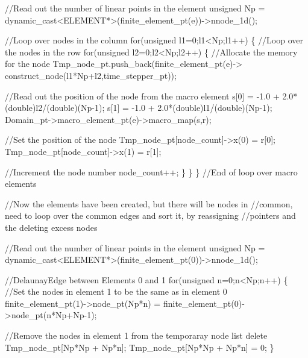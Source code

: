 \begin{DoxyCodeInclude}
     \textcolor{comment}{//Read out the number of linear points in the element}
     \textcolor{keywordtype}{unsigned} Np = 
      \textcolor{keyword}{dynamic\_cast<}ELEMENT*\textcolor{keyword}{>}(finite\_element\_pt(e))->nnode\_1d();
     
     \textcolor{comment}{//Loop over nodes in the column}
     \textcolor{keywordflow}{for}(\textcolor{keywordtype}{unsigned} l1=0;l1<Np;l1++)
      \{
       \textcolor{comment}{//Loop over the nodes in the row}
       \textcolor{keywordflow}{for}(\textcolor{keywordtype}{unsigned} l2=0;l2<Np;l2++)
        \{
         \textcolor{comment}{//Allocate the memory for the node}
         Tmp\_node\_pt.push\_back(finite\_element\_pt(e)->
                           construct\_node(l1*Np+l2,time\_stepper\_pt));
         
         \textcolor{comment}{//Read out the position of the node from the macro element}
         s[0] = -1.0 + 2.0*(double)l2/(\textcolor{keywordtype}{double})(Np-1);
         s[1] = -1.0 + 2.0*(double)l1/(\textcolor{keywordtype}{double})(Np-1);
         Domain\_pt->macro\_element\_pt(e)->macro\_map(s,r);
         
         \textcolor{comment}{//Set the position of the node}
         Tmp\_node\_pt[node\_count]->x(0) = r[0];
         Tmp\_node\_pt[node\_count]->x(1) = r[1];
         
         \textcolor{comment}{//Increment the node number}
         node\_count++;
        \}
      \}
    \} \textcolor{comment}{//End of loop over macro elements}
 
   \textcolor{comment}{//Now the elements have been created, but there will be nodes in }
   \textcolor{comment}{//common, need to loop over the common edges and sort it, by reassigning}
   \textcolor{comment}{//pointers and the deleting excess nodes}
   
   \textcolor{comment}{//Read out the number of linear points in the element}
   \textcolor{keywordtype}{unsigned} Np = 
    \textcolor{keyword}{dynamic\_cast<}ELEMENT*\textcolor{keyword}{>}(finite\_element\_pt(0))->nnode\_1d();

   \textcolor{comment}{//DelaunayEdge between Elements 0 and 1}
   \textcolor{keywordflow}{for}(\textcolor{keywordtype}{unsigned} n=0;n<Np;n++)
    \{
     \textcolor{comment}{//Set the nodes in element 1 to be the same as in element 0}
     finite\_element\_pt(1)->node\_pt(Np*n)
      = finite\_element\_pt(0)->node\_pt(n*Np+Np-1);

     \textcolor{comment}{//Remove the nodes in element 1 from the temporaray node list}
     \textcolor{keyword}{delete} Tmp\_node\_pt[Np*Np + Np*n];
     Tmp\_node\_pt[Np*Np + Np*n] = 0;
    \}


\end{DoxyCodeInclude}
